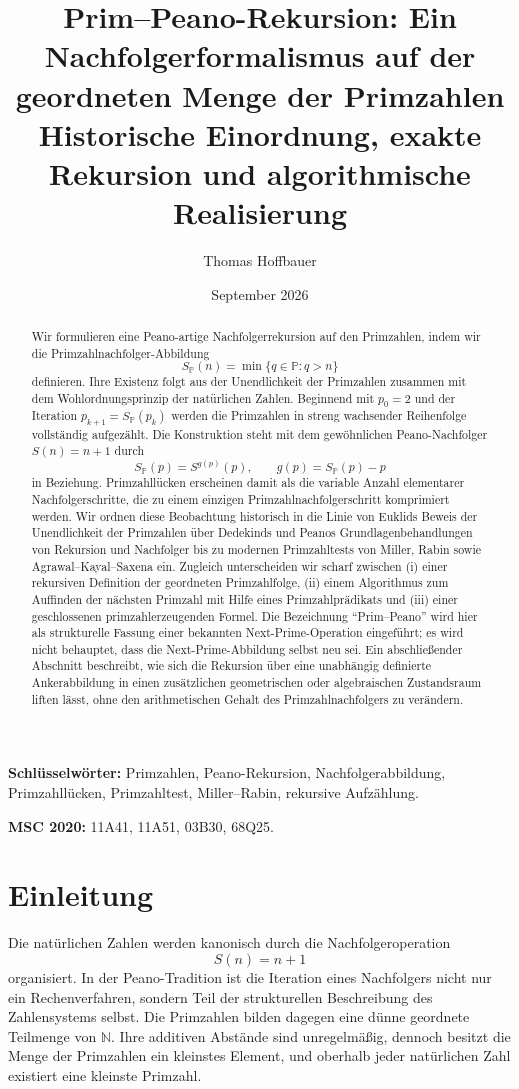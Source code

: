 \documentclass[11pt]{article}
\title{\textbf{Prim--Peano-Rekursion: Ein Nachfolgerformalismus auf der geordneten Menge der Primzahlen}\\[0.35em]
\large Historische Einordnung, exakte Rekursion und algorithmische Realisierung}
\author{Thomas Hoffbauer}
\date{September 2026}
\theoremstyle{definition}
\newcommand{\N}{\mathbb{N}}
\newcommand{\Pp}{\mathbb{P}}
\newcommand{\SP}{S_{\!\Pp}}
\newcommand{\gap}{g}
\begin{document}
\maketitle

\begin{abstract}
Wir formulieren eine Peano-artige Nachfolgerrekursion auf den Primzahlen, indem wir die Primzahlnachfolger-Abbildung
\[
\SP(n)=\min\{q\in\Pp:q>n\}
\]
definieren. Ihre Existenz folgt aus der Unendlichkeit der Primzahlen zusammen mit dem Wohlordnungsprinzip der natürlichen Zahlen. Beginnend mit $p_0=2$ und der Iteration $p_{k+1}=\SP(p_k)$ werden die Primzahlen in streng wachsender Reihenfolge vollständig aufgezählt. Die Konstruktion steht mit dem gewöhnlichen Peano-Nachfolger $S(n)=n+1$ durch
\[
\SP(p)=S^{\gap(p)}(p),\qquad \gap(p)=\SP(p)-p
\]
in Beziehung. Primzahllücken erscheinen damit als die variable Anzahl elementarer Nachfolgerschritte, die zu einem einzigen Primzahlnachfolgerschritt komprimiert werden. Wir ordnen diese Beobachtung historisch in die Linie von Euklids Beweis der Unendlichkeit der Primzahlen über Dedekinds und Peanos Grundlagenbehandlungen von Rekursion und Nachfolger bis zu modernen Primzahltests von Miller, Rabin sowie Agrawal--Kayal--Saxena ein. Zugleich unterscheiden wir scharf zwischen (i) einer rekursiven Definition der geordneten Primzahlfolge, (ii) einem Algorithmus zum Auffinden der nächsten Primzahl mit Hilfe eines Primzahlprädikats und (iii) einer geschlossenen primzahlerzeugenden Formel. Die Bezeichnung ``Prim--Peano'' wird hier als strukturelle Fassung einer bekannten Next-Prime-Operation eingeführt; es wird nicht behauptet, dass die Next-Prime-Abbildung selbst neu sei. Ein abschließender Abschnitt beschreibt, wie sich die Rekursion über eine unabhängig definierte Ankerabbildung in einen zusätzlichen geometrischen oder algebraischen Zustandsraum liften lässt, ohne den arithmetischen Gehalt des Primzahlnachfolgers zu verändern.
\end{abstract}

\textbf{Schlüsselwörter:} Primzahlen, Peano-Rekursion, Nachfolgerabbildung, Primzahllücken, Primzahltest, Miller--Rabin, rekursive Aufzählung.

\textbf{MSC 2020:} 11A41, 11A51, 03B30, 68Q25.

\section{Einleitung}

Die natürlichen Zahlen werden kanonisch durch die Nachfolgeroperation
\[
S(n)=n+1
\]
organisiert. In der Peano-Tradition ist die Iteration eines Nachfolgers nicht nur ein Rechenverfahren, sondern Teil der strukturellen Beschreibung des Zahlensystems selbst. Die Primzahlen bilden dagegen eine dünne geordnete Teilmenge von $\N$. Ihre additiven Abstände sind unregelmäßig, dennoch besitzt die Menge der Primzahlen ein kleinstes Element, und oberhalb jeder natürlichen Zahl existiert eine kleinste Primzahl.
\end{document}
